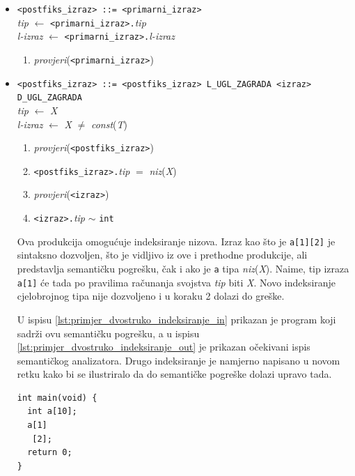 \documentclass[times, 12pt, utf8]{book}
\begin{document}
\begin{itemize}

\item
\verb|<postfiks_izraz> ::= <primarni_izraz>|\\
\emph{tip} \(\leftarrow\) \verb|<primarni_izraz>.|\emph{tip}\\
\emph{l-izraz} \(\leftarrow\) \verb|<primarni_izraz>.|\emph{l-izraz}
\begin{enumerate}
\item
\emph{provjeri}(\verb|<primarni_izraz>|)
\end{enumerate}

\item
\verb|<postfiks_izraz> ::= <postfiks_izraz> L_UGL_ZAGRADA <izraz> D_UGL_ZAGRADA|\\
\emph{tip} \(\leftarrow\) \emph{X}\\
\emph{l-izraz} \(\leftarrow\) \emph{X} \(\neq\) \emph{const}(\emph{T})
\begin{enumerate}
\item
\emph{provjeri}(\verb|<postfiks_izraz>|)
\item
\verb|<postfiks_izraz>.|\emph{tip} \(=\) \emph{niz}(\emph{X})
\item
\emph{provjeri}(\verb|<izraz>|)
\item
\verb|<izraz>.|\emph{tip} \(\sim\) \verb|int| 
\end{enumerate}

Ova produkcija omogućuje indeksiranje nizova.
Izraz kao što je \verb|a[1][2]| je sintaksno dozvoljen, što je vidljivo iz ove i prethodne produkcije, ali predstavlja semantičku pogrešku, čak i ako je \verb|a| tipa \emph{niz}(\emph{X}).
Naime, tip izraza \verb|a[1]| će tada po pravilima računanja svojstva \emph{tip} biti \emph{X}.
Novo indeksiranje cjelobrojnog tipa nije dozvoljeno i u koraku 2 dolazi do greške.

U ispisu \ref{lst:primjer_dvostruko_indeksiranje_in} prikazan je program koji sadrži ovu semantičku pogrešku, a u ispisu \ref{lst:primjer_dvostruko_indeksiranje_out} je prikazan očekivani ispis semantičkog analizatora.
Drugo indeksiranje je namjerno napisano u novom retku kako bi se ilustriralo da do semantičke pogreške dolazi upravo tada.

\begin{lstlisting}[caption={Program sa semantičkom pogreškom višestrukog indeksiranja niza.},label=lst:primjer_dvostruko_indeksiranje_in]
int main(void) {
  int a[10];
  a[1]
   [2];
  return 0;
}
\end{lstlisting}


\end{itemize}
\end{document}
